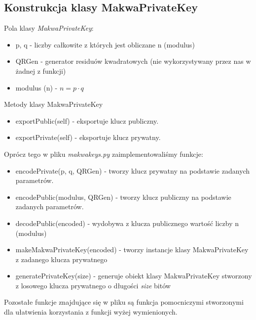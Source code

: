 \documentclass[a4paper,titleauthor]{mwart}
\begin{document}
\subsection{Konstrukcja klasy MakwaPrivateKey}
Pola klasy \textit{MakwaPrivateKey}:
\begin{itemize}
	\item p, q - liczby całkowite z których jest obliczane n (modulus)
	\item QRGen - generator residuów kwadratowych (nie wykorzystywany przez nas w żadnej z funkcji)
	\item modulus (n) - $n=p\cdot q$
\end{itemize}
Metody klasy MakwaPrivateKey
\begin{itemize}
	\item exportPublic(self) - eksportuje klucz publiczny.
	\item exportPrivate(self) - eksportuje klucz prywatny.
\end{itemize}
Oprócz tego w pliku \textit{makwakeys.py} zaimplementowaliśmy funkcje:
\begin{itemize}
	\item encodePrivate(p, q, QRGen) - tworzy klucz prywatny na podstawie zadanych parametrów.
	\item encodePublic(modulus, QRGen) - tworzy klucz publiczny na podstawie zadanych parametrów.
	\item decodePublic(encoded) - wydobywa z klucza publicznego wartość liczby n (modulus)
	\item makeMakwaPrivateKey(encoded) - tworzy instancje klasy MakwaPrivateKey z zadanego klucza prywatnego
	\item generatePrivateKey(size) - generuje obiekt klasy MakwaPrivateKey stworzony z losowego klucza prywatnego o długości \textit{size} bitów
\end{itemize}
Pozostałe funkcje znajdujące się w pliku są funkcja pomocniczymi stworzonymi dla ułatwienia korzystania z funkcji wyżej wymienionych.
\end{document}
